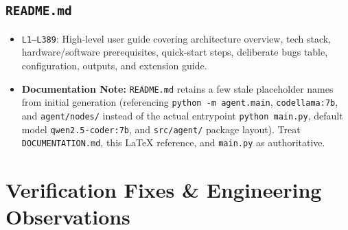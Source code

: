 \documentclass[11pt,a4paper]{article}
\begin{document}
\subsection{\texttt{README.md}}
\begin{itemize}[leftmargin=1.5em]
    \item \texttt{L1--L389}: High-level user guide covering architecture overview, tech stack, hardware/software prerequisites, quick-start steps, deliberate bugs table, configuration, outputs, and extension guide.
    \item \textbf{Documentation Note:} \texttt{README.md} retains a few stale placeholder names from initial generation (referencing \texttt{python -m agent.main}, \texttt{codellama:7b}, and \texttt{agent/nodes/} instead of the actual entrypoint \texttt{python main.py}, default model \texttt{qwen2.5-coder:7b}, and \texttt{src/agent/} package layout). Treat \texttt{DOCUMENTATION.md}, this LaTeX reference, and \texttt{main.py} as authoritative.
\end{itemize}

\section{Verification Fixes \& Engineering Observations}
\end{document}
